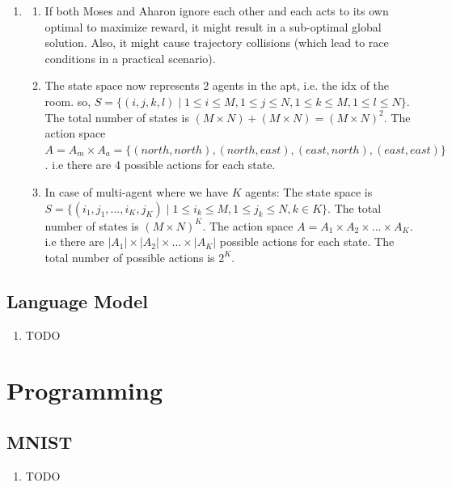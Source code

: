 \documentclass{assignmeownt}
\begin{document}
\begin{enumerate}
    \item
    \begin{enumerate}[label=(\alph*)] 
        \item If both Moses and Aharon ignore each other and each acts to its own optimal to maximize reward, it might result in a sub-optimal global solution. Also, it might cause trajectory collisions (which lead to race conditions in a practical scenario).  
        \item The state space now represents 2 agents in the apt, i.e. the idx of the room. so, $S=\{(i,j,k,l) \mid 1\leq i\leq M, 1\leq j\leq N, 1\leq k\leq M, 1\leq l\leq N\}$. The total number of states is $(M \times N) + (M \times N) = (M \times N)^2$.
        \newline
        The action space $A = A_m \times A_a = \{(north, north), (north, east), (east, north), (east, east)\}$. i.e there are 4 possible actions for each state.
        \item In case of multi-agent where we have $K$ agents:
        \newline
        The state space is $S=\{(i_1,j_1,...,i_K,j_K) \mid 1\leq i_k\leq M, 1\leq j_k\leq N,  k\in K\}$. The total number of states is $(M \times N)^K$.
        \newline
        The action space $A = A_1 \times A_2 \times ... \times A_K$. i.e there are $|A_1| \times |A_2| \times ... \times |A_K|$ possible actions for each state. The total number of possible actions is $2^K$.

    \end{enumerate}

    
    
\end{enumerate} %

\subsection{Language Model} 
\begin{enumerate} %
    \item TODO
\end{enumerate} %

\newpage
\section{Programming}
\subsection{MNIST}
    \begin{enumerate} %
        \item TODO
    \end{enumerate} %
\end{document}
